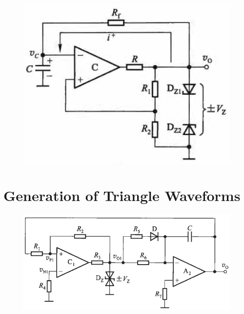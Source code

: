 \begin{figure}[H]
  \centering
  \includegraphics[width=0.5\linewidth]{figures/Square}
\end{figure}

\section{Generation of Triangle Waveforms}

\begin{figure}[H]
  \centering
  \includegraphics[width=0.8\linewidth]{figures/Triangle}
\end{figure}

